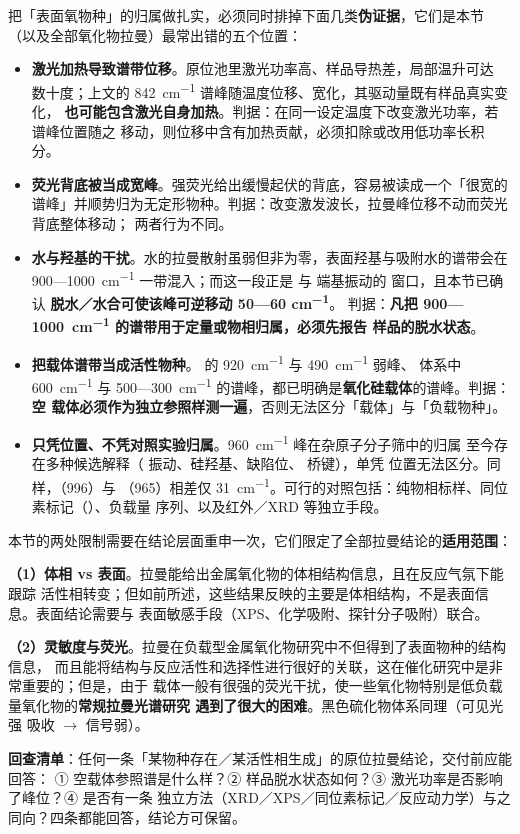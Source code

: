 \begin{pitfall}
把「表面氧物种」的归属做扎实，必须同时排掉下面几类\textbf{伪证据}，它们是本节
（以及全部氧化物拉曼）最常出错的五个位置：

\begin{itemize}
\item \textbf{激光加热导致谱带位移}。原位池里激光功率高、样品导热差，局部温升可达
  数十度；上文的 \qty{842}{cm^{-1}} 谱峰随温度位移、宽化，其驱动量既有样品真实变化，
  \textbf{也可能包含激光自身加热}。判据：在同一设定温度下改变激光功率，若谱峰位置随之
  移动，则位移中含有加热贡献，必须扣除或改用低功率长积分。
\item \textbf{荧光背底被当成宽峰}。强荧光给出缓慢起伏的背底，容易被读成一个「很宽的
  谱峰」并顺势归为无定形物种。判据：改变激发波长，拉曼峰位移不动而荧光背底整体移动；
  两者行为不同。
\item \textbf{水与羟基的干扰}。水的拉曼散射虽弱但非为零，表面羟基与吸附水的谱带会在
  900—\qty{1000}{cm^{-1}} 一带混入；而这一段正是  与  端基振动的
  窗口，且本节已确认 \textbf{脱水／水合可使该峰可逆移动 50—60 \unit{cm^{-1}}}。
  判据：\textbf{凡把 900—\qty{1000}{cm^{-1}} 的谱带用于定量或物相归属，必须先报告
  样品的脱水状态}。
\item \textbf{把载体谱带当成活性物种}。 的 \qty{920}{cm^{-1}} 与
  \qty{490}{cm^{-1}} 弱峰、 体系中 \qty{600}{cm^{-1}} 与
  500—\qty{300}{cm^{-1}} 的谱峰，都已明确是\textbf{氧化硅载体}的谱峰。判据：\textbf{空
  载体必须作为独立参照样测一遍}，否则无法区分「载体」与「负载物种」。
\item \textbf{只凭位置、不凭对照实验归属}。\qty{960}{cm^{-1}} 峰在杂原子分子筛中的归属
  至今存在多种候选解释（ 振动、硅羟基、缺陷位、 桥键），单凭
  位置无法区分。同样，（996）与 （965）相差仅
  \qty{31}{cm^{-1}}。可行的对照包括：纯物相标样、同位素标记（）、负载量
  序列、以及红外／XRD 等独立手段。
\end{itemize}
\end{pitfall}

\begin{crosscheck}
本节的两处限制需要在结论层面重申一次，它们限定了全部拉曼结论的\textbf{适用范围}：

\textbf{（1）体相 vs 表面}。拉曼能给出金属氧化物的体相结构信息，且在反应气氛下能跟踪
活性相转变；但如前所述，这些结果反映的主要是体相结构，不是表面信息。表面结论需要与
表面敏感手段（XPS、化学吸附、探针分子吸附）联合。

\textbf{（2）灵敏度与荧光}。拉曼在负载型金属氧化物研究中不但得到了表面物种的结构信息，
而且能将结构与反应活性和选择性进行很好的关联，这在催化研究中是非常重要的；但是，由于
载体一般有很强的荧光干扰，使一些氧化物特别是低负载量氧化物的\textbf{常规拉曼光谱研究
遇到了很大的困难}。黑色硫化物体系同理（可见光强
吸收 $\rightarrow$ 信号弱）。

\textbf{回查清单}：任何一条「某物种存在／某活性相生成」的原位拉曼结论，交付前应能回答：
① 空载体参照谱是什么样？② 样品脱水状态如何？③ 激光功率是否影响了峰位？④ 是否有一条
独立方法（XRD／XPS／同位素标记／反应动力学）与之同向？四条都能回答，结论方可保留。
\end{crosscheck}

